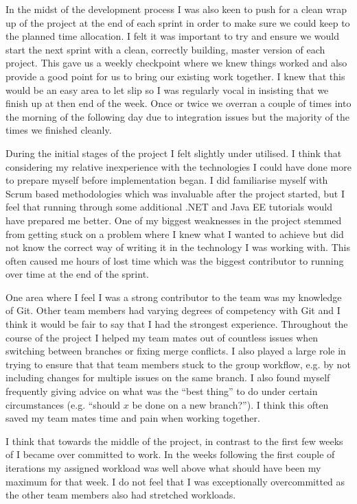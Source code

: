 \documentclass[paper=a4, fontsize=11pt]{scrartcl}	%
\numberwithin{equation}{section}															%
\numberwithin{figure}{section}																%
\numberwithin{table}{section}
\begin{document}
In the midst of the development process I was also keen to push for a clean wrap up of the project at the end of each sprint in order to make sure we could keep to the planned time allocation. I felt it was important to try and ensure we would start the next sprint with a clean, correctly building, master version of each project. This gave us a weekly checkpoint where we knew things worked and also provide a good point for us to bring our existing work together. I knew that this would be an easy area to let slip so I was regularly vocal in insisting that we finish up at then end of the week. Once or twice we overran a couple of times into the morning of the following day due to integration issues but the majority of the times we finished cleanly.  

During the initial stages of the project I felt slightly under utilised. I think that considering my relative inexperience with the technologies I could have done more to prepare myself before implementation began. I did familiarise myself with Scrum based methodologies which was invaluable after the project started, but I feel that running through some additional .NET and Java EE tutorials would have prepared me better. One of my biggest weaknesses in the project stemmed from getting stuck on a problem where I knew what I wanted to achieve but did not know the correct way of writing it in the technology I was working with. This often caused me hours of lost time which was the biggest contributor to running over time at the end of the sprint.

One area where I feel I was a strong contributor to the team was my knowledge of Git. Other team members had varying degrees of competency with Git and I think it would be fair to say that I had the strongest experience. Throughout the course of the project I helped my team mates out of countless issues when switching between branches or fixing merge conflicts. I also played a large role in trying to ensure that that team members stuck to the group workflow, e.g. by not including changes for multiple issues on the same branch. I also found myself frequently giving advice on what was the ``best thing'' to do under certain circumstances (e.g. ``should $x$ be done on a new branch?''). I think this often saved my team mates time and pain when working together.

I think that towards the middle of the project, in contrast to the first few weeks of I became over committed to work. In the weeks following the first couple of iterations my assigned workload was well above what should have been my maximum for that week. I do not feel that I was exceptionally overcommitted as the other team members also had stretched workloads. 
\end{document}
